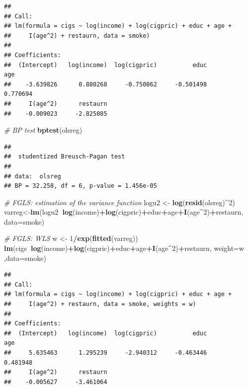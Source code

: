 \documentclass[]{book}
\newenvironment{Shaded}{\begin{snugshade}}{\end{snugshade}}
\newcommand{\CommentTok}[1]{\textcolor[rgb]{0.56,0.35,0.01}{\textit{#1}}}
\newcommand{\DataTypeTok}[1]{\textcolor[rgb]{0.13,0.29,0.53}{#1}}
\newcommand{\DecValTok}[1]{\textcolor[rgb]{0.00,0.00,0.81}{#1}}
\newcommand{\KeywordTok}[1]{\textcolor[rgb]{0.13,0.29,0.53}{\textbf{#1}}}
\newcommand{\NormalTok}[1]{#1}
\newcommand{\OperatorTok}[1]{\textcolor[rgb]{0.81,0.36,0.00}{\textbf{#1}}}
\newcommand{\StringTok}[1]{\textcolor[rgb]{0.31,0.60,0.02}{#1}}
\begin{document}
\begin{verbatim}
## 
## Call:
## lm(formula = cigs ~ log(income) + log(cigpric) + educ + age + 
##     I(age^2) + restaurn, data = smoke)
## 
## Coefficients:
##  (Intercept)   log(income)  log(cigpric)          educ           age  
##    -3.639826      0.880268     -0.750862     -0.501498      0.770694  
##     I(age^2)      restaurn  
##    -0.009023     -2.825085
\end{verbatim}

\begin{Shaded}
\begin{Highlighting}[]
\CommentTok{# BP test}
\KeywordTok{bptest}\NormalTok{(olsreg)}
\end{Highlighting}
\end{Shaded}

\begin{verbatim}
## 
##  studentized Breusch-Pagan test
## 
## data:  olsreg
## BP = 32.258, df = 6, p-value = 1.456e-05
\end{verbatim}

\begin{Shaded}
\begin{Highlighting}[]
\CommentTok{# FGLS: estimation of the variance function}
\NormalTok{logu2 <-}\StringTok{ }\KeywordTok{log}\NormalTok{(}\KeywordTok{resid}\NormalTok{(olsreg)}\OperatorTok{^}\DecValTok{2}\NormalTok{)}
\NormalTok{varreg<-}\KeywordTok{lm}\NormalTok{(logu2}\OperatorTok{~}\KeywordTok{log}\NormalTok{(income)}\OperatorTok{+}\KeywordTok{log}\NormalTok{(cigpric)}\OperatorTok{+}\NormalTok{educ}\OperatorTok{+}\NormalTok{age}\OperatorTok{+}\KeywordTok{I}\NormalTok{(age}\OperatorTok{^}\DecValTok{2}\NormalTok{)}\OperatorTok{+}\NormalTok{restaurn, }
           \DataTypeTok{data=}\NormalTok{smoke)}

\CommentTok{# FGLS: WLS}
\NormalTok{w <-}\StringTok{ }\DecValTok{1}\OperatorTok{/}\KeywordTok{exp}\NormalTok{(}\KeywordTok{fitted}\NormalTok{(varreg))}
\KeywordTok{lm}\NormalTok{(cigs}\OperatorTok{~}\KeywordTok{log}\NormalTok{(income)}\OperatorTok{+}\KeywordTok{log}\NormalTok{(cigpric)}\OperatorTok{+}\NormalTok{educ}\OperatorTok{+}\NormalTok{age}\OperatorTok{+}\KeywordTok{I}\NormalTok{(age}\OperatorTok{^}\DecValTok{2}\NormalTok{)}\OperatorTok{+}\NormalTok{restaurn, }
   \DataTypeTok{weight=}\NormalTok{w ,}\DataTypeTok{data=}\NormalTok{smoke)}
\end{Highlighting}
\end{Shaded}

\begin{verbatim}
## 
## Call:
## lm(formula = cigs ~ log(income) + log(cigpric) + educ + age + 
##     I(age^2) + restaurn, data = smoke, weights = w)
## 
## Coefficients:
##  (Intercept)   log(income)  log(cigpric)          educ           age  
##     5.635463      1.295239     -2.940312     -0.463446      0.481948  
##     I(age^2)      restaurn  
##    -0.005627     -3.461064
\end{verbatim}
\end{document}

